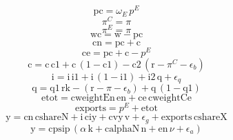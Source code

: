 \begin{dmath}
{{\mathrm{pc}}}={{\omega_{E}}}\, {{p^{E}}}
\end{dmath}
\begin{dmath}
{{\pi^{C}}}={{\pi}}
\end{dmath}
\begin{dmath}
{{\pi^{E}}}={{\pi}}
\end{dmath}
\begin{dmath}
{{\mathrm{wc}}}={{\mathrm{w}}}-{{\mathrm{pc}}}
\end{dmath}
\begin{dmath}
{{\mathrm{cn}}}={{\mathrm{pc}}}+{{\mathrm{c}}}
\end{dmath}
\begin{dmath}
{{\mathrm{ce}}}={{\mathrm{pc}}}+{{\mathrm{c}}}-{{p^{E}}}
\end{dmath}
\begin{dmath}
{{\mathrm{c}}}={{\mathrm{c}}}\, {{\mathrm{c1}}}+{{\mathrm{c}}}\, \left(1-{{\mathrm{c1}}}\right)-{{\mathrm{c2}}}\, \left({{\mathrm{r}}}-{{\pi^{C}}}-{{\epsilon_{b}}}\right)
\end{dmath}
\begin{dmath}
{{\mathrm{i}}}={{\mathrm{i}}}\, {{\mathrm{i1}}}+{{\mathrm{i}}}\, \left(1-{{\mathrm{i1}}}\right)+{{\mathrm{i2}}}\, {{\mathrm{q}}}+{{\epsilon_{q}}}
\end{dmath}
\begin{dmath}
{{\mathrm{q}}}={{\mathrm{q1}}}\, {{\mathrm{rk}}}-\left({{\mathrm{r}}}-{{\pi}}-{{\epsilon_{b}}}\right)+{{\mathrm{q}}}\, \left(1-{{\mathrm{q1}}}\right)
\end{dmath}
\begin{dmath}
{{\mathrm{etot}}}={{\mathrm{cweightEn}}}\, {{\mathrm{en}}}+{{\mathrm{ce}}}\, {{\mathrm{cweightCe}}}
\end{dmath}
\begin{dmath}
{{\mathrm{exports}}}={{p^{E}}}+{{\mathrm{etot}}}
\end{dmath}
\begin{dmath}
{{\mathrm{y}}}={{\mathrm{cn}}}\, {{\mathrm{cshareN}}}+{{\mathrm{i}}}\, {{\mathrm{ciy}}}+{{\mathrm{cvy}}}\, {{\mathrm{v}}}+{{\epsilon_{g}}}+{{\mathrm{exports}}}\, {{\mathrm{cshareX}}}
\end{dmath}
\begin{dmath}
{{\mathrm{y}}}={{\mathrm{cpsip}}}\, \left({{\alpha}}\, {{\mathrm{k}}}+{{\mathrm{calphaN}}}\, {{\mathrm{n}}}+{{\mathrm{en}}}\, {{\nu}}+{{\epsilon_{a}}}\right)
\end{dmath}
